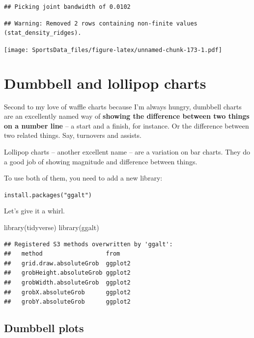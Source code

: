 \documentclass[
]{book}
\newenvironment{Shaded}{\begin{snugshade}}{\end{snugshade}}
\newcommand{\FunctionTok}[1]{\textcolor[rgb]{0.00,0.00,0.00}{#1}}
\newcommand{\NormalTok}[1]{#1}
\begin{document}
\begin{verbatim}
## Picking joint bandwidth of 0.0102
\end{verbatim}

\begin{verbatim}
## Warning: Removed 2 rows containing non-finite values (stat_density_ridges).
\end{verbatim}

\texttt{[image: SportsData\_files/figure-latex/unnamed-chunk-173-1.pdf]}

\hypertarget{dumbbell-and-lollipop-charts}{%
\chapter{Dumbbell and lollipop charts}\label{dumbbell-and-lollipop-charts}}

Second to my love of waffle charts because I'm always hungry, dumbbell charts are an excellently named way of \textbf{showing the difference between two things on a number line} -- a start and a finish, for instance. Or the difference between two related things. Say, turnovers and assists.

Lollipop charts -- another excellent name -- are a variation on bar charts. They do a good job of showing magnitude and difference between things.

To use both of them, you need to add a new library:

\texttt{install.packages("ggalt")}

Let's give it a whirl.

\begin{Shaded}
\begin{Highlighting}[]
\FunctionTok{library}\NormalTok{(tidyverse)}
\FunctionTok{library}\NormalTok{(ggalt)}
\end{Highlighting}
\end{Shaded}

\begin{verbatim}
## Registered S3 methods overwritten by 'ggalt':
##   method                  from   
##   grid.draw.absoluteGrob  ggplot2
##   grobHeight.absoluteGrob ggplot2
##   grobWidth.absoluteGrob  ggplot2
##   grobX.absoluteGrob      ggplot2
##   grobY.absoluteGrob      ggplot2
\end{verbatim}

\hypertarget{dumbbell-plots}{%
\section{Dumbbell plots}\label{dumbbell-plots}}
\end{document}

